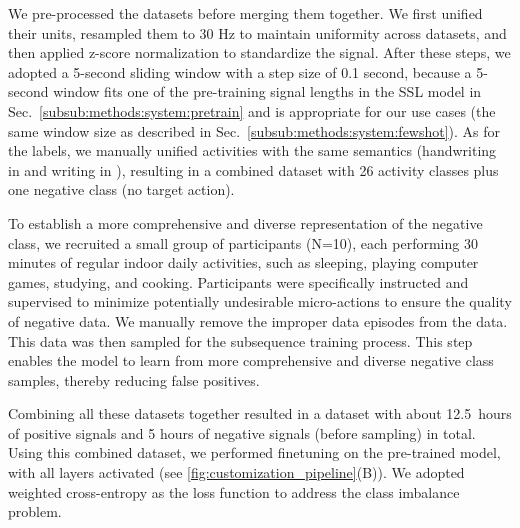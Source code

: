 We pre-processed the datasets before merging them together. We first unified their units, resampled them to 30 Hz to maintain uniformity across datasets, and then applied z-score normalization to standardize the signal. After these steps, we adopted a 5-second sliding window with a step size of 0.1 second, because a 5-second window fits one of the pre-training signal lengths in the SSL model in Sec.~\ref{subsub:methods:system:pretrain} and is appropriate for our use cases (the same window size as described in Sec.~\ref{subsub:methods:system:fewshot}).
As for the labels, we manually unified activities with the same semantics (\eg handwriting in \cite{hu_2022_7058383} and writing in \cite{bhattacharya2022leveraging}), resulting in a combined dataset with 26 activity classes plus one negative class (no target action).


To establish a more comprehensive and diverse representation of the negative class, we recruited a small group of participants (N=10), each performing 30 minutes of regular indoor daily activities, such as sleeping, playing computer games, studying, and cooking. Participants were specifically instructed and supervised to minimize potentially undesirable micro-actions to ensure the quality of negative data. We manually remove the improper data episodes from the data. This data was then sampled for the subsequence training process. This step enables the model to learn from more comprehensive and diverse negative class samples, thereby reducing false positives.

Combining all these datasets together resulted in a dataset with about 12.5~hours of positive signals and 5 hours of negative signals (before sampling) in total. Using this combined dataset, we performed finetuning on the pre-trained model, with all layers activated (see \autoref{fig:customization_pipeline}(B)).
We adopted weighted cross-entropy as the loss function to address the class imbalance problem.



